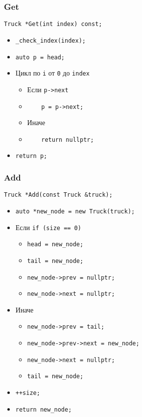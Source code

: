 \subsubsection*{Get}

\begin{lstlisting}
Truck *Get(int index) const;
\end{lstlisting}

\begin{itemize}
	\item \verb|_check_index(index);|
	\item \verb|auto p = head;|
	\item Цикл по \verb|i| от \verb|0| до \verb|index|
	\begin{itemize}
		\item Если \verb|p->next|
		\item \verb|    p = p->next;|
		\item Иначе
		\item \verb|    return nullptr;|
	\end{itemize}
	\item \verb|return p;|
\end{itemize}

\subsubsection*{Add}

\begin{lstlisting}
Truck *Add(const Truck &truck);
\end{lstlisting}

\begin{itemize}
	\item \verb|auto *new_node = new Truck(truck);|
	\item Если \verb|if (size == 0)|
	\begin{itemize}
		\item \verb|head = new_node;|
		\item \verb|tail = new_node;|
		\item \verb|new_node->prev = nullptr;|
		\item \verb|new_node->next = nullptr;|
	\end{itemize}
	\item Иначе
	\begin{itemize}
		\item \verb|new_node->prev = tail;|
		\item \verb|new_node->prev->next = new_node;|
		\item \verb|new_node->next = nullptr;|
		\item \verb|tail = new_node;|
	\end{itemize}
	\item \verb|++size;|
	\item \verb|return new_node;|
\end{itemize}

